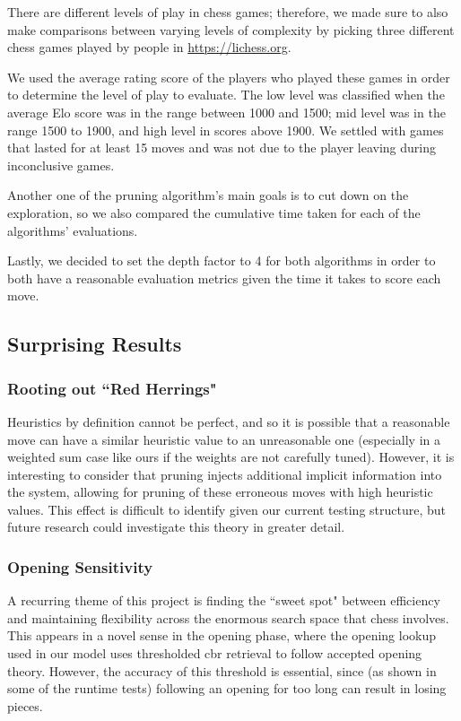 \documentclass[letterpaper]{article}
\begin{document}
There are different levels of play in chess games; therefore, we made sure to also make comparisons between varying levels of complexity by picking three different chess games played by people in \url{https://lichess.org}. 

We used the average rating score of the players who played these games in order to determine the level of play to evaluate. The low level was classified when the average Elo score was in the range between 1000 and 1500; mid level was in the range 1500 to 1900, and high level in scores above 1900. We settled with games that lasted for at least 15 moves and was not due to the player leaving during inconclusive games.

Another one of the pruning algorithm’s main goals is to cut down on the exploration, so we also compared the cumulative time taken for each of the algorithms' evaluations.

Lastly, we decided to set the depth factor to 4 for both algorithms in order to both have a reasonable evaluation metrics given the time it takes to score each move.
\subsection{Surprising Results}
\subsubsection{Rooting out ``Red Herrings"}
Heuristics by definition cannot be perfect, and so it is possible that a reasonable move can have a similar heuristic value to an unreasonable one (especially in a weighted sum case like ours if the weights are not carefully tuned).  However, it is interesting to consider that pruning injects additional implicit information into the system, allowing for pruning of these erroneous moves with high heuristic values.  This effect is difficult to identify given our current testing structure, but future research could investigate this theory in greater detail.

\subsubsection{Opening Sensitivity}
A recurring theme of this project is finding the ``sweet spot" between efficiency and maintaining flexibility across the enormous search space that chess involves.  This appears in a novel sense in the opening phase, where the opening lookup used in our model uses thresholded \acrshort{cbr} retrieval to follow accepted opening theory.  However, the accuracy of this threshold is essential, since (as shown in some of  the runtime tests) following an opening for too long can result in losing pieces.
\end{document}
